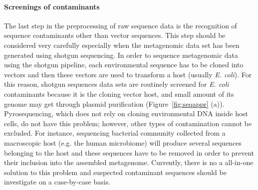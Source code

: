 \paragraph{Screenings of contaminants}
The last step in the preprocessing of raw sequence data is the recognition of sequence contaminants other than vector sequences. This step should be considered very carefully especially when the metagenomic data set has been  generated using shotgun sequencing. In order to sequence metagenomic data using the shotgun pipeline, each environmental sequence has to be cloned into vectors and then these vectors are used to transform a host (usually \textit{E. coli}). For this reason, shotgun sequences data sets are routinely screened for \textit{E. coli} contaminants because it is the cloning vector host, and small amount of its genome may get through plasmid purification (Figure~\ref{fig:seqappr} (a)). Pyrosequencing, which does not rely on cloning environmental DNA inside host cells, do not have this problem; however, other types of contamination cannot be excluded. For instance, sequencing bacterial community collected from a macroscopic host (e.g. the human microbiome) will produce several sequences belonging to the host and these sequences have to be removed in order to prevent their inclusion into the assembled metagenome. Currently, there is no a all-in-one solution to this problem and suspected contaminant sequences should be investigate on a case-by-case basis.\\%

